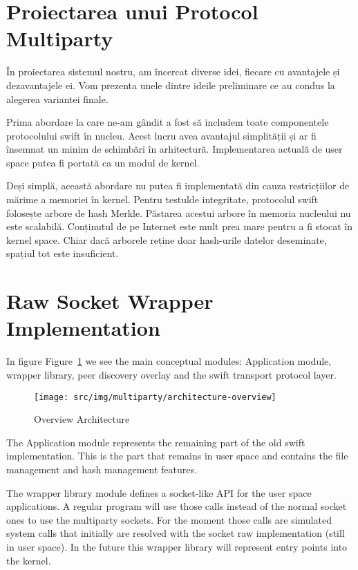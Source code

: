 \section{Proiectarea unui Protocol Multiparty}
\label{sec:multiparty:design}

În proiectarea sistemul nostru, am încercat diverse idei, fiecare cu
avantajele și dezavantajele ei. Vom prezenta unele dintre ideile
preliminare ce au condus la alegerea variantei finale.

Prima abordare la care ne-am gândit a fost să includem toate componentele
protocolului swift în nucleu. Acest lucru avea avantajul simplității și ar
fi însemnat un minim de schimbări în arhitectură. Implementarea actuală de
user space putea fi portată ca un modul de kernel.

Deși simplă, această abordare nu putea fi implementată din cauza
restricțiilor de mărime a memoriei în kernel. Pentru testulde integritate,
protocolul swift folosește arbore de hash Merkle. Păstarea acestui arbore
în memoria nucleului nu este scalabilă. Conținutul de pe Internet este mult
prea mare pentru a fi stocat în kernel space. Chiar dacă arborele reține
doar hash-urile datelor deseminate, spațiul tot este insuficient.

\section{Raw Socket Wrapper Implementation}
\label{sec:multiparty:raw-socket}

In figure Figure~\ref{fig:multiparty:architecture-overview} we see the main
conceptual modules: Application module, wrapper library, peer discovery
overlay and the swift transport protocol layer.

\begin{figure}
  \centering
  \texttt{[image: src/img/multiparty/architecture-overview]}
  \caption{Overview Architecture}
  \label{fig:multiparty:architecture-overview}
\end{figure}

The Application module represents the remaining part of the old swift
implementation. This is the part that remains in user space and contains the
file management and hash management features. 

The wrapper library module defines a socket-like API for the user space
applications. A regular program will use those calls instead of the normal
socket ones to use the multiparty sockets. For the moment those calls are
simulated system calls that initially are resolved with the socket raw
implementation (still in user space). In the future this wrapper library
will represent entry points into the kernel.

